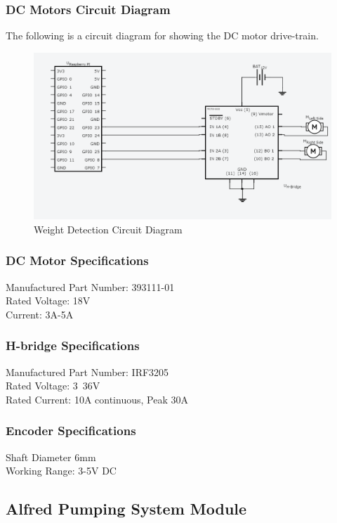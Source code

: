 \documentclass [10pt]{article}
\begin{document}
\subsubsection{DC Motors Circuit Diagram}
The following is a circuit diagram for showing the DC motor drive-train.
\begin{figure} [h!]
	\centering
	\includegraphics [scale = 0.6] {Figures/H_Bridge.png}
	\caption{Weight Detection Circuit Diagram}
\end{figure}

\subsubsection{DC Motor Specifications}
Manufactured Part Number: 393111-01\\
Rated Voltage: 18V\\
Current: 3A-5A\\

\subsubsection{H-bridge Specifications}
Manufactured Part Number:  IRF3205\\
Rated Voltage: 3~36V \\
Rated Current: 10A continuous, Peak 30A \\

\subsubsection{Encoder Specifications}
Shaft Diameter 6mm\\
Working Range: 3-5V DC\\

\subsection{Alfred Pumping System Module}
\end{document}
